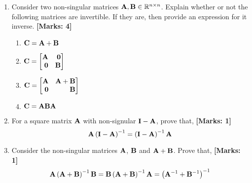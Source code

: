 \documentclass[12pt]{article}
\def\mf{\ensuremath\mathbf}
\def\mb{\ensuremath\mathbb}
\def\lp{\ensuremath\left(}
\def\rp{\ensuremath\right)}
\def\bmx{\ensuremath\begin{bmatrix*}[r]}
\def\emx{\ensuremath\end{bmatrix*}}
\begin{document}
\begin{enumerate}
  \item Consider two non-singular matrices $\mf{A}, \mf{B} \in \mb{R}^{n \times n}$. Explain whether or not the following matrices are invertible. If they are, then provide an expression for it inverse. \textbf{[Marks: 4]}
  \begin{enumerate}
      \item $\mf{C} = \mf{A} + \mf{B}$
      \item $\mf{C} = \bmx \mf{A} & \mf{0}\\\mf{0} & \mf{B}\emx$
      \item $\mf{C} = \bmx \mf{A} & \mf{A} + \mf{B}\\\mf{0} & \mf{B}\emx$
      \item $\mf{C} = \mf{A}\mf{B}\mf{A}$
  \end{enumerate}

  \item For a square matrix $\mf{A}$ with non-signular $\mf{I} - \mf{A}$, prove that, \textbf{[Marks: 1]}
  \[ \mf{A}\lp\mf{I} - \mf{A}\rp^{-1} = \lp\mf{I} - \mf{A}\rp^{-1}\mf{A} \]

  \item Consider the non-singular matrices $\mf{A}$, $\mf{B}$ and $\mf{A} + \mf{B}$. Prove that, \textbf{[Marks: 1]}
  \[ \mf{A}\lp\mf{A} + \mf{B}\rp^{-1}\mf{B} = \mf{B}\lp\mf{A} + \mf{B}\rp^{-1}\mf{A} = \lp\mf{A}^{-1} + \mf{B}^{-1}\rp^{-1} \]

\end{enumerate}
\end{document}
